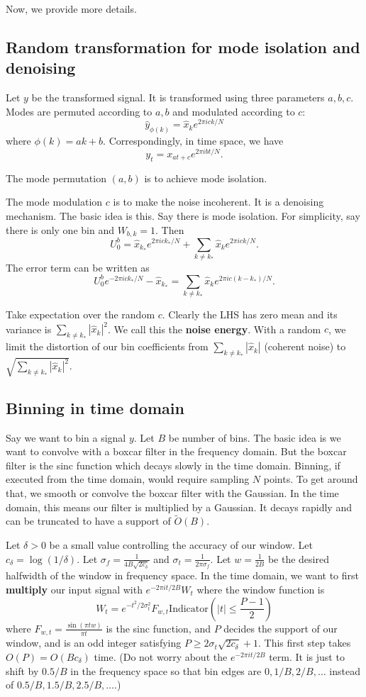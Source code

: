 \documentclass[10pt]{article}
\begin{document}
Now, we provide more details.

\subsection{Random transformation for mode isolation and denoising}
Let $y$ be the transformed signal. It is transformed using three parameters $a,b,c$. Modes are permuted according to $a, b$ and modulated according to $c$:
$$\hat{y}_{\phi(k)} = \hat{x}_k e^{2\pi i ck/N}$$
where $\phi(k) = ak+b$. Correspondingly, in time space, we have
$$y_t = x_{at+c} e^{2\pi i bt/N}.$$

The mode permutation $(a,b)$ is to achieve mode isolation.

The mode modulation $c$ is to make the noise incoherent. It is a denoising mechanism. The basic idea is this. Say there is mode isolation. For simplicity, say there is only one bin and $W_{b,k}=1$. Then
$$U^b_0 = \hat{x}_{k_*}e^{2\pi i c k_*/N} + \sum_{k\neq k_*} \hat{x}_k e^{2\pi i c k/N}.$$
The error term can be written as
$$U^b_0 e^{-2\pi i c k_*/N} -\hat{x}_{k_*} = \sum_{k\neq k_*} \hat{x}_k e^{2\pi i c(k-k_*)/N}.$$

Take expectation over the random $c$. Clearly the LHS has zero mean and its variance is $\sum_{k\neq k_*} |\hat{x}_k|^2$. We call this the \textbf{noise energy}. With a random $c$, we limit the distortion of our bin coefficients from $\sum_{k\neq k_*} |\hat{x}_k|$ (coherent noise) to $\sqrt{\sum_{k\neq k_*} |\hat{x}_k|^2}$.

\subsection{Binning in time domain}

Say we want to bin a signal $y$. Let $B$ be number of bins. The basic idea is we want to convolve with a boxcar filter in the frequency domain. But the boxcar filter is the sinc function which decays slowly in the time domain. Binning, if executed from the time domain, would require sampling $N$ points. To get around that, we smooth or convolve the boxcar filter with the Gaussian. In the time domain, this means our filter is multiplied by a Gaussian. It decays rapidly and can be truncated to have a support of $\tilde{O}(B)$.

Let $\delta>0$ be a small value controlling the accuracy of our window. Let $c_{\delta} = \log (1/\delta)$. Let $\sigma_f = \frac{1}{4B\sqrt{2c_{\delta}}}$ and $\sigma_t = \frac{1}{2\pi \sigma_f}$. Let $w=\frac{1}{2B}$ be the desired halfwidth of the window in frequency space. In the time domain, we want to first \textbf{multiply} our input signal with $e^{-2\pi i t/2B}W_t$ where the window function is 
$$W_t = e^{-t^2/2\sigma_t^2} F_{w,t} \text{Indicator}\left(|t|\leq \frac{P-1}{2}\right)$$
where $F_{w,t} = \frac{\sin(\pi t w)}{\pi t}$ is the sinc function, and $P$ decides the support of our window, and is an odd integer satisfying $P \geq 2\sigma_t \sqrt{2c_{\delta}} + 1$. This first step takes $O(P)=O(B c_{\delta})$ time. (Do not worry about the $e^{-2\pi i t/2B}$ term. It is just to shift by $0.5/B$ in the frequency space so that bin edges are $0, 1/B, 2/B, \ldots$ instead of $0.5/B, 1.5/B, 2.5/B, \ldots$.)
\end{document}
